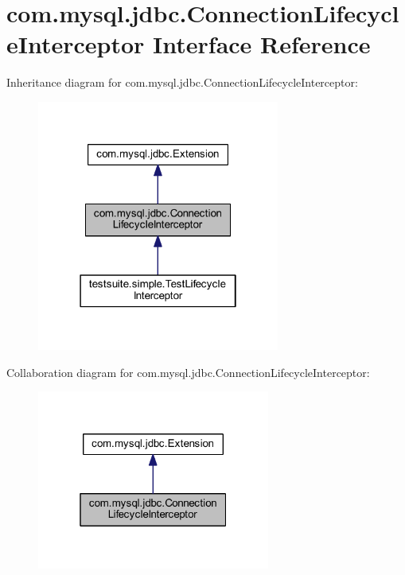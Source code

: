 \hypertarget{interfacecom_1_1mysql_1_1jdbc_1_1_connection_lifecycle_interceptor}{}\section{com.\+mysql.\+jdbc.\+Connection\+Lifecycle\+Interceptor Interface Reference}
\label{interfacecom_1_1mysql_1_1jdbc_1_1_connection_lifecycle_interceptor}


Inheritance diagram for com.\+mysql.\+jdbc.\+Connection\+Lifecycle\+Interceptor\+:\nopagebreak
\begin{figure}[H]
\begin{center}
\leavevmode
\includegraphics[width=226pt]{interfacecom_1_1mysql_1_1jdbc_1_1_connection_lifecycle_interceptor__inherit__graph}
\end{center}
\end{figure}


Collaboration diagram for com.\+mysql.\+jdbc.\+Connection\+Lifecycle\+Interceptor\+:\nopagebreak
\begin{figure}[H]
\begin{center}
\leavevmode
\includegraphics[width=217pt]{interfacecom_1_1mysql_1_1jdbc_1_1_connection_lifecycle_interceptor__coll__graph}
\end{center}
\end{figure}
